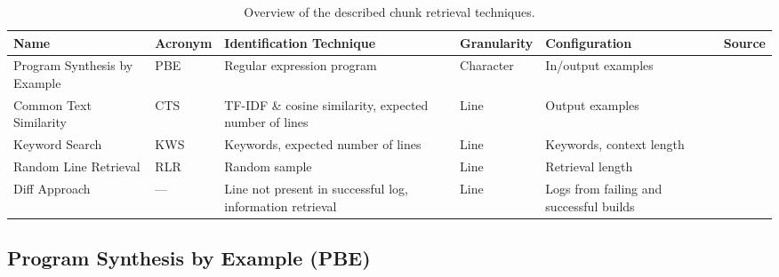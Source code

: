\begin{table*}[]
\centering
\caption{Overview of the described chunk retrieval techniques.}
\begin{tabularx}{\textwidth}{@{}XlXlXX@{}} 
\toprule
Name                         & Acronym & Identification Technique                                   & Granularity & Configuration & Source            \\ 
\midrule
Program Synthesis by Example & PBE     & Regular expression program                                 & Character   & In/output examples      \\
Common Text Similarity       & CTS     & TF-IDF \& cosine similarity, expected number of lines & Line        & Output examples           \\
Keyword Search               & KWS     & Keywords, expected number of lines                    & Line        & Keywords, context length  \\
Random Line Retrieval        & RLR     & Random sample                                              & Line        & Retrieval length          \\
Diff Approach                & ---     & Line not present in successful log, information retrieval  & Line        & Logs from failing and successful builds      \\
\bottomrule
\end{tabularx}
\label{tab:ctr}
\end{table*}

\subsection{Program Synthesis by Example (PBE)}
\label{sec:expl-pbe}

